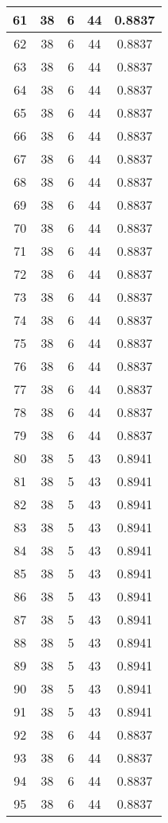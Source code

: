 \documentclass[letterpaper, 12pt]{article}
\begin{document}
\begin{longtable}{|c|c|c|c|c|}
61 & 38 & 6 & 44 & 0.8837 \\
\hline
62 & 38 & 6 & 44 & 0.8837 \\
\hline
63 & 38 & 6 & 44 & 0.8837 \\
\hline
64 & 38 & 6 & 44 & 0.8837 \\
\hline
65 & 38 & 6 & 44 & 0.8837 \\
\hline
66 & 38 & 6 & 44 & 0.8837 \\
\hline
67 & 38 & 6 & 44 & 0.8837 \\
\hline
68 & 38 & 6 & 44 & 0.8837 \\
\hline
69 & 38 & 6 & 44 & 0.8837 \\
\hline
70 & 38 & 6 & 44 & 0.8837 \\
\hline
71 & 38 & 6 & 44 & 0.8837 \\
\hline
72 & 38 & 6 & 44 & 0.8837 \\
\hline
73 & 38 & 6 & 44 & 0.8837 \\
\hline
74 & 38 & 6 & 44 & 0.8837 \\
\hline
75 & 38 & 6 & 44 & 0.8837 \\
\hline
76 & 38 & 6 & 44 & 0.8837 \\
\hline
77 & 38 & 6 & 44 & 0.8837 \\
\hline
78 & 38 & 6 & 44 & 0.8837 \\
\hline
79 & 38 & 6 & 44 & 0.8837 \\
\hline
80 & 38 & 5 & 43 & 0.8941 \\
\hline
81 & 38 & 5 & 43 & 0.8941 \\
\hline
82 & 38 & 5 & 43 & 0.8941 \\
\hline
83 & 38 & 5 & 43 & 0.8941 \\
\hline
84 & 38 & 5 & 43 & 0.8941 \\
\hline
85 & 38 & 5 & 43 & 0.8941 \\
\hline
86 & 38 & 5 & 43 & 0.8941 \\
\hline
87 & 38 & 5 & 43 & 0.8941 \\
\hline
88 & 38 & 5 & 43 & 0.8941 \\
\hline
89 & 38 & 5 & 43 & 0.8941 \\
\hline
90 & 38 & 5 & 43 & 0.8941 \\
\hline
91 & 38 & 5 & 43 & 0.8941 \\
\hline
92 & 38 & 6 & 44 & 0.8837 \\
\hline
93 & 38 & 6 & 44 & 0.8837 \\
\hline
94 & 38 & 6 & 44 & 0.8837 \\
\hline
95 & 38 & 6 & 44 & 0.8837 \\

\end{longtable}
\end{document}
